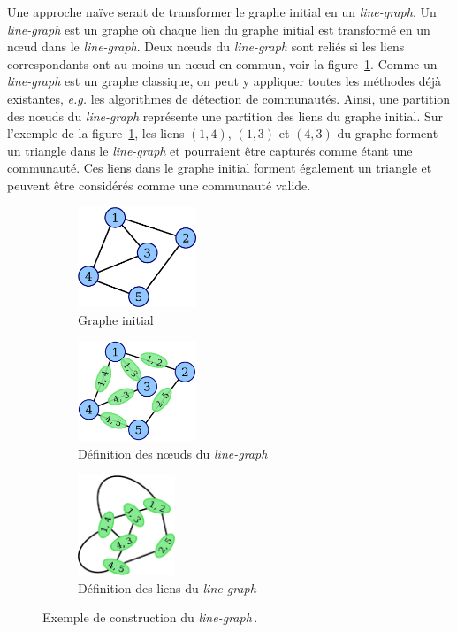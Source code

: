 Une approche naïve serait de transformer le graphe initial en un \emph{line-graph}.
Un \emph{line-graph} est un graphe où chaque lien du graphe initial est transformé en un n\oe ud dans le \emph{line-graph}.
Deux n\oe uds du \emph{line-graph} sont reliés si les liens correspondants ont au moins un n\oe ud en commun, voir la figure~\ref{fig:ex_construction_lineG}.
Comme un \emph{line-graph} est un graphe classique, on peut y appliquer toutes les méthodes déjà existantes, \emph{e.g.} les algorithmes de détection de communautés.
Ainsi, une partition des n\oe uds du \emph{line-graph} représente une partition des liens du graphe initial.
Sur l'exemple de la figure~\ref{fig:ex_construction_lineG}, les liens $(1,4)$, $(1,3)$ et $(4, 3)$ du graphe forment un triangle dans le \emph{line-graph} et pourraient être capturés comme étant une communauté.
Ces liens dans le graphe initial forment également un triangle et peuvent être considérés comme une communauté valide.
\begin{figure}
\centering
	\begin{subfigure}{0.25\textwidth}
		\includegraphics[height=3cm]{img/ExpectedNodes/Line_graph_construction_1.eps}
		\caption{Graphe initial}
	\end{subfigure}\hspace*{0.5cm}
	\begin{subfigure}{0.25\textwidth}
		\includegraphics[height=3cm]{img/ExpectedNodes/Line_graph_construction_2.eps}
		\caption{Définition des n\oe uds du \emph{line-graph}}
	\end{subfigure}\hspace*{0.5cm}
	\begin{subfigure}{0.25\textwidth}
		\includegraphics[height=3cm]{img/ExpectedNodes/Line_graph_construction_3.eps}
		\caption{Définition des liens du \emph{line-graph}}
	\end{subfigure}	
	\caption{Exemple de construction du \emph{line-graph}\,\protect\footnotemark.}
	\label{fig:ex_construction_lineG}
\end{figure}


